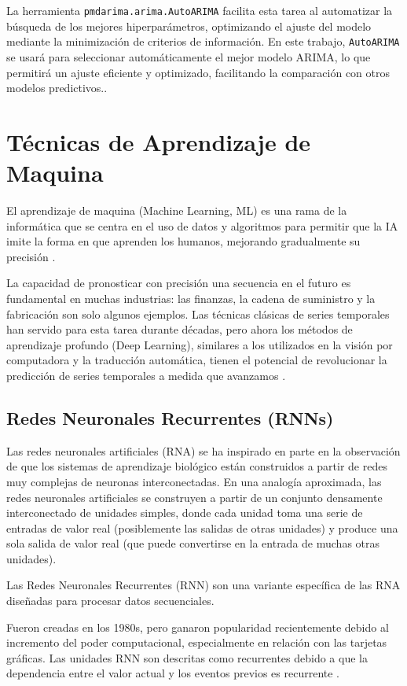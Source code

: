 La herramienta \texttt{pmdarima.arima.AutoARIMA} facilita esta tarea al automatizar la búsqueda de los mejores hiperparámetros, optimizando el ajuste del modelo mediante la minimización de criterios de información. En este trabajo, \texttt{AutoARIMA} se usará para seleccionar automáticamente el mejor modelo ARIMA, lo que permitirá un ajuste eficiente y optimizado, facilitando la comparación con otros modelos predictivos.\cite{autoarima}.

\section{Técnicas de Aprendizaje de Maquina}

El aprendizaje de maquina (Machine Learning, ML) es una rama de la informática que se centra en el uso de datos y algoritmos para permitir que la IA imite la forma en que aprenden los humanos, mejorando gradualmente su precisión \cite{ibm:deep-learning}.

La capacidad de pronosticar con precisión una secuencia en el futuro es fundamental en muchas industrias: las finanzas, la cadena de suministro y la fabricación son solo algunos ejemplos. Las técnicas clásicas de series temporales han servido para esta tarea durante décadas, pero ahora los métodos de aprendizaje profundo (Deep Learning), similares a los utilizados en la visión por computadora y la traducción automática, tienen el potencial de revolucionar la predicción de series temporales a medida que avanzamos \cite{francesca-lazzeri}.

\subsection{Redes Neuronales Recurrentes (RNNs)}
Las redes neuronales artificiales (RNA) se ha inspirado en parte en la observación de que los sistemas de aprendizaje biológico están construidos a partir de redes muy complejas de neuronas interconectadas. En una analogía aproximada, las redes neuronales artificiales se construyen a partir de un conjunto densamente interconectado de unidades simples, donde cada unidad toma una serie de entradas de valor real (posiblemente las salidas de otras unidades) y produce una sola salida de valor real (que puede convertirse en la entrada de muchas otras unidades).

Las Redes Neuronales Recurrentes (RNN) son una variante específica de las RNA diseñadas para procesar datos secuenciales.

Fueron creadas en los 1980s, pero ganaron popularidad recientemente debido al incremento del poder computacional, especialmente en relación con las tarjetas gráficas. Las unidades RNN son descritas como recurrentes debido a que la dependencia entre el valor actual y los eventos previos es recurrente \cite{francesca-lazzeri}.

